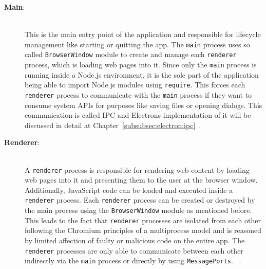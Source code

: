 \begin{description}
    \item[\textbf{Main}:] \hfill \\ This is the main entry point of the application and responsible for lifecycle management like starting or quitting the app.
    The \texttt{main} process uses so called \texttt{BrowserWindow} module to create and manage each \texttt{renderer} process, which is loading web pages into it.
    Since only the \texttt{main} process is running inside a Node.js environment, it is the sole part of the application being able to import Node.js modules using \texttt{require}.
    This forces each \texttt{renderer} process to communicate with the \texttt{main} process if they want to consume system \ac{API}s for purposes like saving files or opening dialogs.
    This communication is called \ac{IPC} and Electrons implementation of it will be discussed in detail at Chapter~\ref{subsubsec:electron:ipc}~\cite{ElectronDoc,electron-in-action}.

    \newpage
    \item[\textbf{Renderer}:] \hfill \\ A \texttt{renderer} process is responsible for rendering web content by loading web pages into it and presenting them to the user at the browser window.
    Additionally, JavaScript code can be loaded and executed inside a \texttt{renderer} process.
    Each \texttt{renderer} process can be created or destroyed by the main process using the \texttt{BrowserWindow} module as mentioned before.
    This leads to the fact that \texttt{renderer} processes are isolated from each other following the Chromium principles of a multiprocess model and is reasoned by limited affection of
    faulty or malicious code on the entire app.
    The \texttt{renderer} processes are only able to communicate between each other indirectly via the \texttt{main} process or directly by using \texttt{MessagePorts}.
    ~\cite{ElectronDoc,electron-in-action}.
\end{description}


